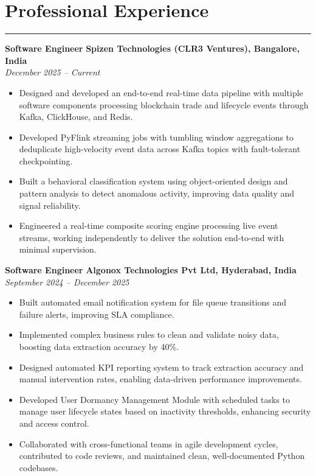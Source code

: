 \documentclass[12pt]{article}
\begin{document}
\section*{Professional Experience}
\vspace{1pt}\hrule\vspace{4pt}

\textbf{Software Engineer} \hfill \textbf{Spizen Technologies (CLR3 Ventures), Bangalore, India} \\
\textit{December 2025 -- Current}
\begin{itemize}
  \item Designed and developed an end-to-end real-time data pipeline with multiple software components processing blockchain trade and lifecycle events through Kafka, ClickHouse, and Redis.
  \item Developed PyFlink streaming jobs with tumbling window aggregations to deduplicate high-velocity event data across Kafka topics with fault-tolerant checkpointing.
  \item Built a behavioral classification system using object-oriented design and pattern analysis to detect anomalous activity, improving data quality and signal reliability.
  \item Engineered a real-time composite scoring engine processing live event streams, working independently to deliver the solution end-to-end with minimal supervision.
\end{itemize}

\textbf{Software Engineer} \hfill \textbf{Algonox Technologies Pvt Ltd, Hyderabad, India} \\
\textit{September 2024 -- December 2025}
\begin{itemize}
  \item Built automated email notification system for file queue transitions and failure alerts, improving SLA compliance.
  \item Implemented complex business rules to clean and validate noisy data, boosting data extraction accuracy by 40\%.
  \item Designed automated KPI reporting system to track extraction accuracy and manual intervention rates, enabling data-driven performance improvements.
  \item Developed User Dormancy Management Module with scheduled tasks to manage user lifecycle states based on inactivity thresholds, enhancing security and access control.
  \item Collaborated with cross-functional teams in agile development cycles, contributed to code reviews, and maintained clean, well-documented Python codebases.
\end{itemize}
\end{document}
